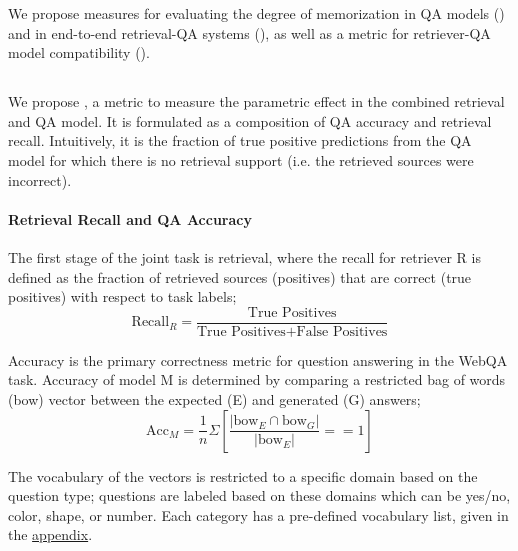 We propose measures for evaluating the degree of memorization in QA models (\ppr) and in end-to-end retrieval-QA systems (\ucr), as well as a metric for retriever-QA model compatibility (\rpa).

\label{sec:measures}
\subsection{\ucr}
We propose \UCR, a metric to measure the parametric effect in the combined retrieval and QA model. It is formulated as a composition of QA accuracy and retrieval recall. Intuitively, it is the fraction of true positive predictions from the QA model for which there is no retrieval support (i.e. the retrieved sources were incorrect).

\paragraph{Retrieval Recall and QA Accuracy}
The first stage of the joint task is retrieval, where the recall for retriever R is defined as the fraction of retrieved sources (positives) that are correct (true positives) with respect to task labels;
\begin{equation}
    \text{Recall}_R = \frac{\text{True Positives}}{\text{True Positives} + \text{False Positives}}
\end{equation}

Accuracy is the primary correctness metric for question answering in the WebQA task. Accuracy of model M is determined by comparing a restricted bag of words (bow) vector between the expected (E) and generated (G) answers;
\begin{equation}
    \label{eq:ACC}
    \text{Acc}_M = \frac{1}{n}\Sigma [\frac{|\text{bow}_{E} \cap \text{bow}_{G}|}{|\text{bow}_{E}|} == 1]
\end{equation}

The vocabulary of the vectors is restricted to a specific domain based on the question type; questions are labeled based on these domains which can be yes/no, color, shape, or number. Each category has a pre-defined vocabulary list, given in the \hyperref[sec:categories]{appendix}.




